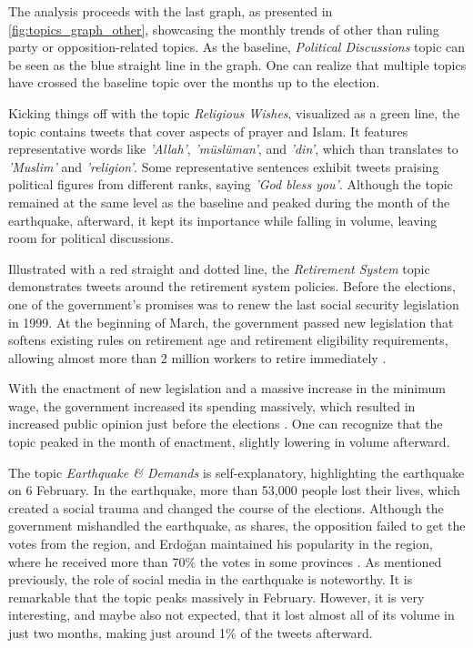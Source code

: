 The analysis proceeds with the last graph, as presented in \autoref{fig:topics_graph_other}, showcasing the 
monthly trends of other than ruling party or opposition-related topics. As the baseline, 
\textit{Political Discussions} topic can be seen as the blue straight line in the graph. 
One can realize that multiple topics have crossed the baseline topic over the months up to the election. 

Kicking things off with the topic \textit{Religious Wishes}, visualized as a green line, the topic contains 
tweets that cover aspects of prayer and Islam. It features representative words like \textit{'Allah'}, 
\textit{'müslüman'}, and \textit{'din'}, which than translates to \textit{'Muslim'} and \textit{'religion'}. 
Some representative sentences exhibit tweets praising political figures from different ranks, 
saying \textit{'God bless you'}. 
Although the topic remained at the same level as the baseline and peaked during the month of the earthquake, 
afterward, it kept its importance while falling in volume, leaving room for political discussions.

Illustrated with a red straight and dotted line, the \textit{Retirement System} topic demonstrates tweets 
around the retirement system policies. Before the elections, one of the government's promises was to renew 
the last social security legislation in 1999. At the beginning of March, the government passed new legislation 
that softens existing rules on retirement age and retirement eligibility requirements, allowing almost more 
than 2 million workers to retire immediately \parencite{erdem_bisgin_retirement_2023}. 

With the enactment of new legislation and a massive increase in the minimum wage, the government increased its 
spending massively, which resulted in increased public opinion just before the elections 
\parencite{cevik_aksoy_turkey_earthquake_2023}. One can recognize that the topic peaked in the month of 
enactment, slightly lowering in volume afterward.

The topic \textit{Earthquake \& Demands} is self-explanatory, highlighting the earthquake on 6 February. 
In the earthquake, more than 53,000 people lost their lives, which created a social trauma and changed the 
course of the elections. Although the government mishandled the earthquake, as 
\textcite{cevik_aksoy_aydin_turkey_after_elections_2023} shares, the opposition failed to get the votes 
from the region, and Erdoğan maintained his popularity in the region, where he received more than 
70\% the votes in some provinces \parencite{michaelson_narli_earthquake_regions_erdogan_2023}.
As mentioned previously, the role of social media in the earthquake is noteworthy.
It is remarkable that the topic peaks massively in February. However, it is very interesting, and maybe 
also not expected, that it lost almost all of its volume in just two months, making just around 
1\% of the tweets afterward. 

